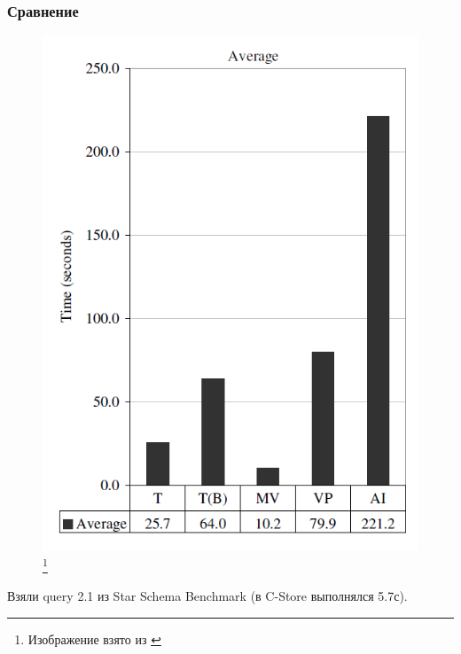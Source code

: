 \documentclass{beamer}
\begin{document}
\begin{frame}
\frametitle{Сравнение}

\begin{figure}[htb]
\includegraphics[width=\textwidth,height=0.75\textheight,keepaspectratio]{comp-1.png} 
\footnote{\tiny{Изображение взято из \cite{Harizopoulos2009}}}
\end{figure}

Взяли query 2.1 из Star Schema Benchmark (в C-Store выполнялся 5.7с).

\end{frame}
\end{document}
